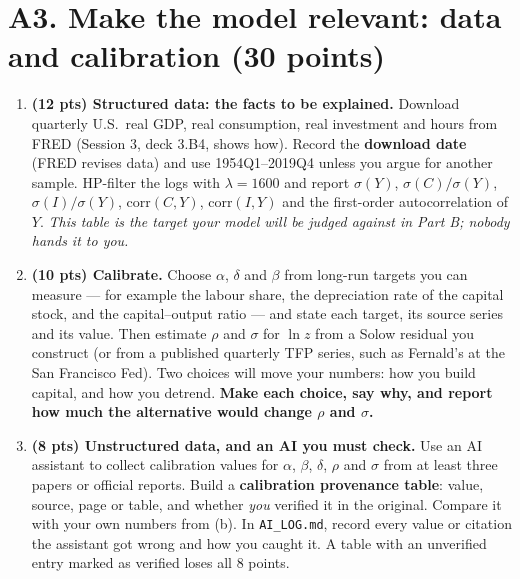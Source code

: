 \documentclass[11pt]{article}
\newif\ifsolutions \solutionsfalse
\newcommand{\solution}[1]{\ifsolutions\medskip
  {\color{blue!45!black}\textbf{Solution.} #1}\medskip\fi}
\begin{document}
\section*{A3. Make the model relevant: data and calibration (30 points)}

\begin{enumerate}[label=(\alph*), leftmargin=*]

\item \textbf{(12 pts) Structured data: the facts to be explained.} Download quarterly U.S.\ real
GDP, real consumption, real investment and hours from FRED (Session 3, deck 3.B4, shows how).
Record the \textbf{download date} (FRED revises data) and use 1954Q1--2019Q4 unless you argue for
another sample. HP-filter the logs with $\lambda=1600$ and report $\sigma(Y)$,
$\sigma(C)/\sigma(Y)$, $\sigma(I)/\sigma(Y)$, $\mathrm{corr}(C,Y)$, $\mathrm{corr}(I,Y)$ and the
first-order autocorrelation of $Y$. \emph{This table is the target your model will be judged
against in Part B; nobody hands it to you.}

\solution{\keyAnine}

\item \textbf{(10 pts) Calibrate.} Choose $\alpha$, $\delta$ and $\beta$ from long-run targets you can
measure --- for example the labour share, the depreciation rate of the capital stock, and the
capital--output ratio --- and state each target, its source series and its value. Then estimate
$\rho$ and $\sigma$ for $\ln z$ from a Solow residual you construct (or from a published quarterly
TFP series, such as Fernald's at the San Francisco Fed). Two choices will move your numbers: how you
build capital, and how you detrend. \textbf{Make each choice, say why, and report how much the
alternative would change $\rho$ and $\sigma$.}

\solution{\keyAten}

\item \textbf{(8 pts) Unstructured data, and an AI you must check.} Use an AI assistant to collect
calibration values for $\alpha$, $\beta$, $\delta$, $\rho$ and $\sigma$ from at least three papers
or official reports. Build a \textbf{calibration provenance table}: value, source, page or table,
and whether \emph{you} verified it in the original. Compare it with your own numbers from (b). In
\texttt{AI\_LOG.md}, record every value or citation the assistant got wrong and how you caught it.
A table with an unverified entry marked as verified loses all 8 points.

\solution{\keyAeleven}

\end{enumerate}
\end{document}
